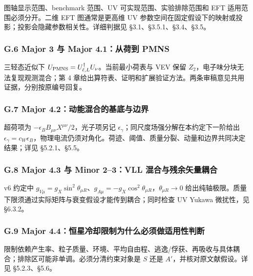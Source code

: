 \documentclass[
  chinese,
  UTF8]{ctexart}
\begin{document}
图轴显示范围、benchmark 范围、UV 可实现范围、实验排除范围和 EFT
适用范围必须分开。二维 EFT 图通常是更高维 UV
参数空间在固定假设下的映射或投影；投影会隐藏参数相关性。详细判据见
§3.1、§3.5.1、§3.4、§3.5。

\subsubsection{G.6 Major 3 与 Major 4.1：从荷到
PMNS}\label{g.6-major-3-ux4e0e-major-4.1ux4eceux8377ux5230-pmns}

三轻态近似下 \(U_{\rm PMNS}=U_{\ell,L}^\dagger U_\nu\)。当前最小荷表与
VEV 保留 \(Z_2\)，电子味分块无法复现观测混合；第 4
章给出算符表、证明和扩展验证方法。两条审稿意见共用证据，分别按原编号回复。

\subsubsection{G.7 Major
4.2：动能混合的基底与边界}\label{g.7-major-4.2ux52a8ux80fdux6df7ux5408ux7684ux57faux5e95ux4e0eux8fb9ux754c}

超荷项为 \(-\epsilon_B B_{\mu\nu}X^{\mu\nu}/2\)，光子项另记
\(\epsilon_\gamma\)；同尺度场强分解在本约定下一阶给出
\(\epsilon_\gamma=c_W\epsilon_B\)，物理电流仍须对角化。荷迹、阈值、质量分裂、动量和边界共同决定结果；详见
§5.2.1、§5.5。

\subsubsection{G.8 Major 4.3 与 Minor 2--3：VLL
混合与残余矢量耦合}\label{g.8-major-4.3-ux4e0e-minor-23vll-ux6df7ux5408ux4e0eux6b8bux4f59ux77e2ux91cfux8026ux5408}

v6 约定中
\(g_{V\mu}=g_X\sin^2\theta_{\mu R}\)、\(g_{A\mu}=-g_X\cos^2\theta_{\mu R}\)，\(\theta_{\mu R}\to0\)
给出纯轴极限。质量下限须通过实际矩阵与衰变假设才能传到耦合；同时检查 UV
Yukawa 微扰性，见 §6.3.2。

\subsubsection{G.9 Major
4.4：恒星冷却限制为什么必须做适用性判断}\label{g.9-major-4.4ux6052ux661fux51b7ux5374ux9650ux5236ux4e3aux4ec0ux4e48ux5fc5ux987bux505aux9002ux7528ux6027ux5224ux65ad}

限制依赖产生率、粒子质量、环境、平均自由程、逃逸/俘获、再吸收与具体耦合；排除区可能非单调。必须分清约束对象是
\(S\) 还是 \(A'\)，并核对原文献假设。详见 §5.2.3、§5.6。
\end{document}
